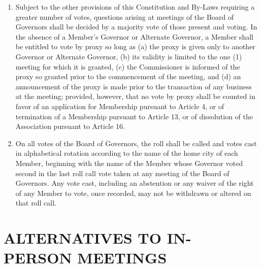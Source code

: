 \documentclass[]{book}
\providecommand{\tightlist}{%
  \setlength{\itemsep}{0pt}\setlength{\parskip}{0pt}}
\begin{document}
\begin{enumerate}
\def\labelenumi{(\alph{enumi})}
\tightlist
\item
  Subject to the other provisions of this Constitution and By-Laws requiring a greater number of votes, questions arising at meetings of the Board of Governors shall be decided by a majority vote of those present and voting. In the absence of a Member's Governor or Alternate Governor, a Member shall be entitled to vote by proxy so long as (a) the proxy is given only to another Governor or Alternate Governor, (b) its validity is limited to the one (1) meeting for which it is granted, (c) the Commissioner is informed of the proxy so granted prior to the commencement of the meeting, and (d) an announcement of the proxy is made prior to the transaction of any business at the meeting; provided, however, that no vote by proxy shall be counted in favor of an application for Membership pursuant to Article 4, or of termination of a Membership pursuant to Article 13, or of dissolution of the Association pursuant to Article 16.
\item
  On all votes of the Board of Governors, the roll shall be called and votes cast in alphabetical rotation according to the name of the home city of each Member, beginning with the name of the Member whose Governor voted second in the last roll call vote taken at any meeting of the Board of Governors. Any vote cast, including an abstention or any waiver of the right of any Member to vote, once recorded, may not be withdrawn or altered on that roll call.
\end{enumerate}

\hypertarget{alternatives-to-in-person-meetings}{%
\section{ALTERNATIVES TO IN-PERSON MEETINGS}\label{alternatives-to-in-person-meetings}}
\end{document}
